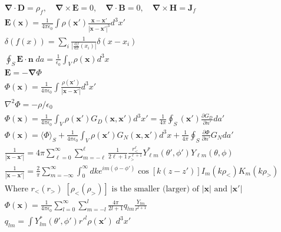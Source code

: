 \documentclass[10pt]{article}
\newcommand{\ve}[1]{\boldsymbol{\mathbf{#1}}}
\newcommand{\vect}[1]{\boldsymbol{\mathbf{#1}}}
\newcommand{\vc}[1]{\mathbf{#1}}
\newcommand{\dd}{\, \mathrm{d}}
\newcommand{\eo}{\epsilon_0}
\newcommand{\tder}[2]{\frac{\dd #1}{\dd #2}}
\newcommand{\pder}[2]{\frac{\partial #1}{\partial #2}}
\newcommand{\K}{\frac{1}{4 \pi \eo}}
\begin{document}
\begin{multicols}{2}
	\tiny
	\setlength{\abovedisplayskip}{-25pt}
	\setlength{\belowdisplayskip}{0pt}
	\setlength{\abovedisplayshortskip}{0pt}
	\begin{align*}
		& \ve{\nabla \cdot D} = \rho_f, \quad \ve{\nabla \times E} = 0, \quad \ve{\nabla \cdot B} = 0, \quad \ve{\nabla \times H} = \ve{J}_f \tag*{Maxwell's equations in matter} \\
		& \vect{E}(\vect{x}) = \frac{1}{4 \pi \eo} \int \rho(\vect{x}') \frac{\vect{x} - \vect{x}'}{|\vect{x} - \vect{x}'|^3} d^3x' \tag*{Coulomb's Law (1.5)} \\
		& \delta(f(x)) = \sum_{i} \frac{1}{\left|\tder{f}{x}(x_i)\right|}\delta(x - x_i)	\tag*{Delta function Rule 5 } \\
		& \oint_S \vc{E} \cdot \vc{n} \; da = \frac{1}{\eo} \int_V \rho(\vc{x}) d^3x	\tag*{Gauss' Law (1.11)} \\
		& \vc{E} = -\vc{\nabla} \Phi	\tag*{Electric field in terms of scalar potential (1.16)} \\
		& \Phi(\vc{x}) = \K \int \frac{\rho (\vc{x}')}{|\vc{x} - \vc{x}'|} d^3 x' \tag*{Scalar potential in terms of charge density (1.17)} \\
		& \nabla^2 \Phi = -\rho/\eo	\tag*{Poisson Equation (1.28)} \\
		& \Phi(\vc{x}) = \K \int_V \rho(\vc{x}') G_D(\vc{x}, \vc{x}') d^3x' = \frac{1}{4 \pi} \oint_S(\vc{x}') \pder{G_D}{n'} da'	\tag*{DBCs (1.44)} \\
		& \Phi(\vc{x}) = \langle\Phi\rangle_S + \K \int_V \rho(\vc{x}') G_N(\vc{x},\vc{x}') d^3x + \frac{1}{4 \pi} \oint_S \pder{\Phi}{n'} G_N da'	\tag*{NBCs (1.46)} \\
		& \frac{1}{|\vc{x} - \vc{x}'|} = 4 \pi \sum_{\ell = 0}^\infty \sum_{m = -\ell}^{\ell} \frac{1}{2 \ell +1} \frac{r_<^\ell}{r_>^{\ell +1}} Y_{\ell m}^*(\theta', \phi') Y_{\ell m}(\theta,\phi)	\tag*{GFE: $r,\theta,\phi$ (3.70)} \\
		& \frac{1}{|\ve{x} - \ve{x}'|} = \frac{2}{\pi} \sum_{m=-\infty}^{\infty} \int_0^\infty dk e^{im(\phi - \phi')} \cos[k(z-z')] I_m(k\rho_<) K_m(k \rho_>) \tag*{GFE (3.148)} \\
		&\text{Where $r_< (r_>) \; [\rho_< (\rho_>)]$ is the smaller (larger) of $|\vc{x}|$ and $|\vc{x}'|$} \\
		& \Phi(\ve{x}) = \K \sum_{l=0}^{\infty} \sum_{m=-l}^{l} \frac{4 \pi}{2 l + 1} q_{lm} \frac{Y_{lm}}{r^{l+1}} \tag*{Potential outside spher of charge (4.1)} \\
		& q_{lm} = \int Y_{lm}^*(\theta', \phi') r'^l \rho(\ve{x}') \; d^3  x' \tag*{Multipole moments (4.3)} \\

\end{align*}
\end{multicols}
\end{document}
